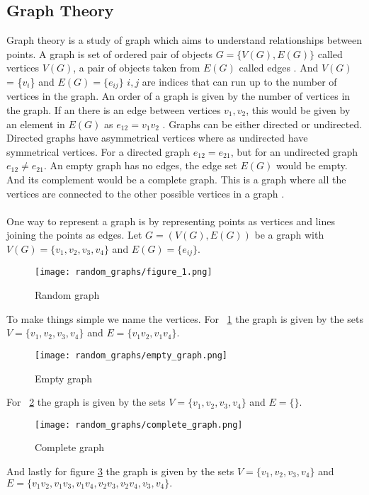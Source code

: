 \documentclass[15pt, a4paper]{Assignment}
\begin{document}
\subsection*{Graph Theory}
Graph theory is a study of graph which aims to understand relationships between points. 
A graph is set of ordered pair of objects $G = \{V(G),E(G)\}$ called vertices $V(G)$, a pair of objects taken from $E(G)$ called edges \cite{BondyMurty2008}.
And $V(G)$ = \{$v_i$\} and $E(G)=\{e_{ij}\}$ $i,j$ are indices that can run up to the number of vertices in the graph. 
An order of a graph is given by the number of vertices in the graph.
If an there is an edge between vertices $v_1 ,v_2$, this would be given by an element in $E(G)$ as $e_{12}=v_1v_2$ \cite{BondyMurty2008}.
Graphs can be either directed or undirected. 
Directed graphs have asymmetrical vertices where as undirected have symmetrical vertices.
For a directed graph $e_{12} = e_{21}$, but for an undirected graph $e_{12} \neq e_{21}$.
An empty graph has no edges, the edge set $E(G)$ would be empty.
And its complement would be a complete graph.
This is a graph where all the vertices are connected to the other possible vertices in a graph \cite{reducible_graph_theory}.
\\\\
One way to represent a graph is by representing points as vertices and lines joining the points as edges.
Let $G = (V(G),E(G))$ be a graph with $V(G) = \{v_1, v_2, v_3, v_4\}$ and $ E(G)=\{e_{ij}\}.$
\begin{figure}[H]
	\centering
	\texttt{[image: random\_graphs/figure\_1.png]}
	\caption{Random graph}
	\label{random_graph}
\end{figure}
To make things simple we name the vertices.
For ~\ref{random_graph} the graph is given by the sets  $V = \{v_1, v_2, v_3, v_4\}$ and $E=\{v_1v_2,v_1v_4\}.$
\begin{figure}[H]
	\centering
	\texttt{[image: random\_graphs/empty\_graph.png]}
	\caption{Empty graph}
	\label{empty_graph}
\end{figure}
For ~\ref{empty_graph} the graph is given by the sets  $V = \{v_1, v_2, v_3, v_4\}$ and $E=\{\}.$
\begin{figure}[H]
	\centering
	\texttt{[image: random\_graphs/complete\_graph.png]}
	\caption{Complete graph}
	\label{complete_graph}
\end{figure}
And lastly for figure \ref{complete_graph} the graph is given by the sets  $V = \{v_1, v_2, v_3, v_4\}$ and $E=\{v_1v_2,v_1v_3,v_1v_4,v_2v_3,v_2v_4,v_3,v_4\}.$ 
\end{document}
